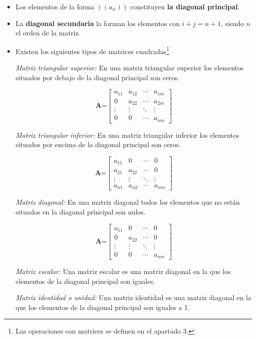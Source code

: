 \begin{itemize}
\item Los elementos de la forma $((a_{ii}))$ constituyen \textbf{la diagonal principal}.
\item La \textbf{diagonal secundaria} la forman los elementos con $i + j = n + 1$, siendo $n$ el orden de la matriz.
\item Existen los siguientes tipos de matrices cuadradas\footnote{Las operaciones con matrices se definen en el apartado 3.}

\textit{Matriz triangular superior:} En una matriz triangular superior los elementos situados por debajo de la diagonal principal son ceros.

$$\textbf{A=}\begin{bmatrix}
a_{11} & a_{12} & \cdots & a_{1m} \\
0 & a_{22} & \cdots & a_{2m} \\
\vdots & \vdots & \ddots & \vdots \\
0 & 0 & \cdots & a_{nm}
\end{bmatrix}
$$

\textit{Matriz triangular inferior:} En una matriz triangular inferior los elementos situados por encima de la diagonal principal son ceros.

$$\textbf{A=}\begin{bmatrix}
a_{11} & 0 & \cdots & 0 \\
a_{21} & a_{22} & \cdots & 0 \\
\vdots & \vdots & \ddots & \vdots \\
a_{n1} & a_{n2} & \cdots & a_{nm}
\end{bmatrix}
$$

\textit{Matriz diagonal:} En una matriz diagonal todos los elementos que no están situados en la diagonal principal son nulos.

$$\textbf{A=}\begin{bmatrix}
a_{11} & 0 & \cdots & 0 \\
0 & a_{22}  & \cdots & 0 \\
\vdots & \vdots & \ddots & \vdots \\
0 & 0 & \cdots & a_{nm}
\end{bmatrix}
$$

\textit{Matriz escalar:} Una matriz  escalar es una matriz diagonal en la que los elementos de la diagonal principal son iguales.

\textit{Matriz identidad o unidad:} Una matriz  identidad es una matriz diagonal en la que los elementos de la diagonal principal son iguales a 1.


\end{itemize}
